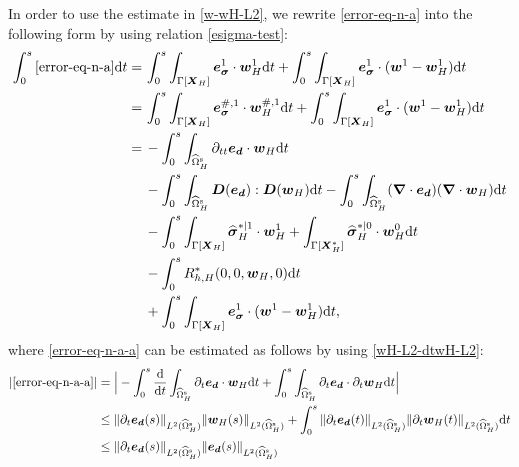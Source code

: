 \documentclass[11pt,reqno]{amsart}
\theoremstyle{definition}
\theoremstyle{plain}
\numberwithin{theorem}{section}
\numberwithin{proposition}{section}
\numberwithin{lemma}{section}
\numberwithin{equation}{section}
\newcommand{\bs}[1]{\boldsymbol{#1}}
\newcommand{\uu}[1]  {{\bs{#1}} }
\newcommand{\dep}{{{\bs{d}}}}
\newcommand{\grad}   { \uu{\nabla}    }
\def\d{\mathrm{d}}
\newcommand{\bw}{{\bs w}}
\renewcommand{\(}{\bigl(}
\renewcommand{\)}{\bigr)}
\begin{document}
\begin{itemize}[leftmargin=20pt]
In order to use the estimate in \eqref{w-wH-L2}, we rewrite \eqref{error-eq-n-a} into the following form by using relation \eqref{esigma-test}: 
\begin{subequations}
\begin{align}
\int_0^s \eqref{error-eq-n-a} \d t
=\, & \int_0^s \int_{\Gamma[\bs X_H]} {\bs e}_{{\bs\sigma}}^1 \cdot {\bs w}_H^1 \d t 
+ \int_0^s \int_{\Gamma[\bs X_H]} {\bs e}_{{\bs\sigma}}^1 \cdot ({\bs w}^1 - {\bs w}_H^1) \d t  \notag\\
=\, & \int_0^s \int_{\Gamma[\bs X_H]} {\bs e}_{{\bs\sigma}}^{\#,1} \cdot {\bs w}_H^{\#,1} \d t 
+ \int_0^s \int_{\Gamma[\bs X_H]} {\bs e}_{{\bs\sigma}}^1 \cdot ({\bs w}^1 - {\bs w}_H^1) \d t  \notag\\
=\, & -\int_0^s \int_{\widehat{\Omega}^{\rm s}_H} \partial_{tt} {\bs e}_{\dep} \cdot {\bs w}_H \d t \label{error-eq-n-a-a}\\
& 
- \int_0^s \int_{\widehat{\Omega}^{\rm s}_H} {\bs D}({\bs e}_\dep):{\bs D}(\bw_H) \d t- \int_0^s\int_{\widehat{\Omega}^{\rm s}_H} (\grad\cdot{\bs e}_\dep) (\grad\cdot \bw_H) \d t\label{error-eq-n-a-b}\\ 
& - \int_0^s\int_{\Gamma[\bs X_H]} {\widehat{\bs\sigma}}_H^{*|1}\cdot \bw_H^1 + \int_{\Gamma[\bs X_H^*]} {\widehat{\bs\sigma}}_H^{*|0} \cdot {\bs w}_H^0 \d t \label{error-eq-n-a-c} \\
& - \int_0^s R_{h,H}^*(0, 0, {\bs w}_H , 0) \d t \label{error-eq-n-a-d} \\
& + \int_0^s \int_{\Gamma[\bs X_H]} {\bs e}_{{\bs\sigma}}^1\cdot ({\bs w}^1 - {\bs w}_H^1) \d t 
\label{error-eq-n-a-e} , 
\end{align}
\end{subequations}
where \eqref{error-eq-n-a-a} can be estimated as follows by using \eqref{wH-L2-dtwH-L2}:
\begin{align}
|\eqref{error-eq-n-a-a}|
&= \Big| - \int_0^s \frac{\d}{\d t} \int_{\widehat{\Omega}^{\rm s}_H}\partial_t{\bs e}_{\dep} \cdot {\bs w}_H\d t + \int_0^s \int_{\widehat{\Omega}^{\rm s}_H} \partial_t{\bs e}_{\dep} \cdot \partial_t{\bs w}_H \d t \Big| \notag \\
&\le \|\partial_t{\bs e}_{\dep}(s)\|_{L^2(\widehat{\Omega}^{\rm s}_H)} \|{\bs w}_H(s)\|_{L^2(\widehat{\Omega}^{\rm s}_H)} 
+ \int_0^s \|\partial_t{\bs e}_{\dep}(t)\|_{L^2(\widehat{\Omega}^{\rm s}_H)} \| \partial_t{\bs w}_H(t)\|_{L^2(\widehat{\Omega}^{\rm s}_H)} \d t \notag \\
&\le \|\partial_t{\bs e}_{\dep}(s)\|_{L^2(\widehat{\Omega}^{\rm s}_H)}  \|{\bs e}_{\dep}(s)\|_{L^2(\widehat{\Omega}^{\rm s}_H)}

\end{align}
\end{itemize}
\end{document}
